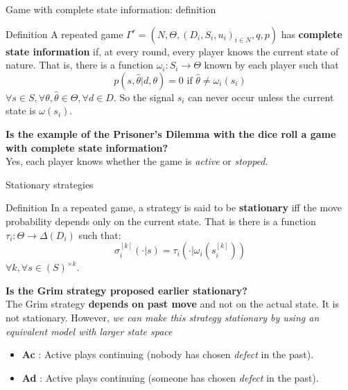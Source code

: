 \begin{frame}{Game with complete state information: definition}
    \begin{block}{Definition}
        A repeated game $\Gamma^r = (N,\Theta, (D_i,S_i,u_i)_{i\in N},q,p)$ has
        \textbf{complete state information} if, at every round, every player knows
        the current state of nature. That is, there is a function
        $\omega_i:S_i \rightarrow \Theta$ known by each player such that
        \begin{equation*}
            p(s,\hat{\theta} | d,\theta) = 0 \text{ if } \hat{\theta} \neq \omega_i(s_i)
        \end{equation*}
        $\forall s \in S, \forall \theta, \hat{\theta} \in \Theta, \forall d \in D$.
        So the signal $s_i$ can never occur unless the current state is $\omega(s_i)$.
    \end{block}

    \pause
    \textbf{{\color{green}Is the example of the Prisoner's Dilemma with the dice roll a game
    with complete state information?}} \\
    \pause
    Yes, each player knows whether the game is \textit{active} or \textit{stopped}.
\end{frame}

\begin{frame}{Stationary strategies}
    \begin{block}{Definition}
        In a repeated game, a strategy is said to be \textbf{stationary} iff the move probability
        depends only on the current state. That is there is a function $\tau_i : \Theta
        \rightarrow \Delta(D_i)$ such that:
        \begin{equation*}
	        \sigma_i^{[k]}(\cdot | s) = \tau_i(\cdot | \omega_i(s_i^{[k]}))
        \end{equation*}
        $\forall k, \forall s \in (S)^{\times k}$.
    \end{block}

    \pause
    \textbf{{\color{green}Is the Grim strategy proposed earlier stationary?}} \\
    \pause
    The Grim strategy \textbf{depends on past move} and not on the actual state. It
    is not stationary.
    \pause
    However, \textit{we can make this strategy stationary by using an equivalent model with larger
    state space}
    \begin{itemize}
        \item \textbf{Ac} : Active plays continuing (nobody has chosen \textit{defect} in the past).
        \item \textbf{Ad} : Active plays continuing (someone has chosen \textit{defect} in the past).
    \end{itemize}
\end{frame}

